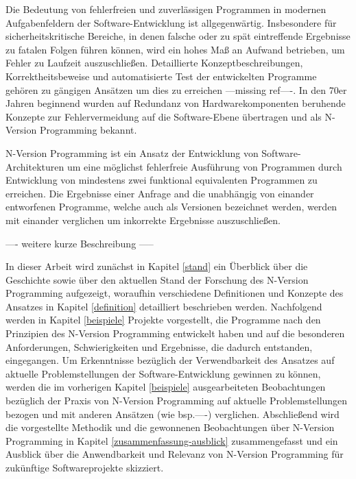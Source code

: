 Die Bedeutung von fehlerfreien und zuverlässigen Programmen in modernen Aufgabenfeldern der Software-Entwicklung ist allgegenwärtig.
Insbesondere für sicherheitskritische Bereiche, in denen falsche oder zu spät eintreffende Ergebnisse zu fatalen Folgen führen können, wird ein hohes Maß an Aufwand betrieben, um Fehler zu Laufzeit auszuschließen.
Detaillierte Konzeptbeschreibungen, Korrektheitsbeweise und automatisierte Test der entwickelten Programme gehören zu gängigen Ansätzen um dies zu erreichen ---missing ref----.
In den 70er Jahren beginnend wurden auf Redundanz von Hardwarekomponenten beruhende Konzepte zur Fehlervermeidung auf die Software-Ebene übertragen und als N-Version Programming \cite{Chen1978} bekannt.



N-Version Programming ist ein Ansatz der Entwicklung von Software-Architekturen um eine möglichst fehlerfreie Ausführung von Programmen durch Entwicklung von mindestens zwei funktional equivalenten Programmen zu erreichen.
Die Ergebnisse einer Anfrage and die unabhängig von einander entworfenen Programme, welche auch als Versionen bezeichnet werden, werden mit einander verglichen um inkorrekte Ergebnisse auszuschließen.

---- weitere kurze Beschreibung -----


In dieser Arbeit wird zunächst in Kapitel \ref{stand} ein Überblick über die Geschichte sowie über den aktuellen Stand der Forschung des N-Version Programming aufgezeigt, woraufhin verschiedene Definitionen und Konzepte des Ansatzes in Kapitel \ref{definition} detailliert beschrieben werden. Nachfolgend werden in Kapitel \ref{beispiele} Projekte vorgestellt, die Programme nach den Prinzipien des N-Version Programming entwickelt haben und auf die besonderen Anforderungen, Schwierigkeiten und Ergebnisse, die dadurch entstanden, eingegangen.
Um Erkenntnisse bezüglich der Verwendbarkeit des Ansatzes auf aktuelle Problemstellungen der Software-Entwicklung gewinnen zu können, werden die im vorherigen Kapitel \ref{beispiele} ausgearbeiteten Beobachtungen bezüglich der Praxis von N-Version Programming auf aktuelle Problemstellungen bezogen und mit anderen Ansätzen (wie bsp.----) verglichen.
Abschließend wird die vorgestellte Methodik und die gewonnenen Beobachtungen über N-Version Programming in Kapitel \ref{zusammenfassung-ausblick} zusammengefasst und ein Ausblick über die Anwendbarkeit und Relevanz von N-Version Programming für zukünftige Softwareprojekte skizziert.